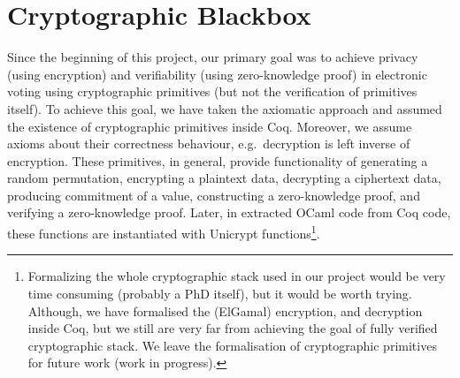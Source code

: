 \section{Cryptographic Blackbox}
Since the beginning of this project, our primary goal was 
to achieve privacy (using encryption) and verifiability (using zero-knowledge proof) in electronic voting 
using cryptographic primitives (but not the verification of primitives itself). 
To achieve this goal, we have 
taken the axiomatic approach and assumed the existence of cryptographic primitives 
inside Coq. Moreover, we assume axioms about their correctness behaviour, e.g.~decryption 
is left inverse of encryption. These primitives, in general, provide functionality 
of generating a random permutation, encrypting a plaintext data, decrypting a ciphertext data, 
producing commitment of a value, constructing a zero-knowledge proof, 
and verifying a zero-knowledge proof. Later, in extracted OCaml code from Coq code, these functions are instantiated 
with Unicrypt \citep{LocherH14} functions\footnote{Formalizing the whole cryptographic stack used in our 
project would be very time consuming (probably a PhD itself), but it would be worth trying. 
Although, we have formalised the (ElGamal) encryption, and decryption inside Coq, but we still 
are very far from achieving the goal of fully verified cryptographic stack.  We leave the formalisation 
of cryptographic primitives for future work (work in progress).}.



